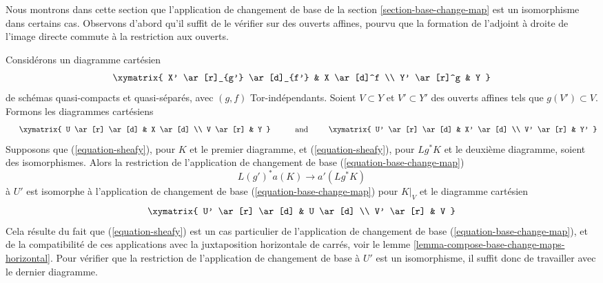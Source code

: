 \noindent
Nous montrons dans cette section que l'application de changement de base de la section \ref{section-base-change-map} est un isomorphisme dans certains cas. Observons d'abord qu'il suffit de le vérifier sur des ouverts affines, pourvu que la formation de l'adjoint à droite de l'image directe commute à la restriction aux ouverts.

\begin{remark}
\label{remark-check-over-affines}
Considérons un diagramme cartésien
$$
\xymatrix{
X' \ar[r]_{g'} \ar[d]_{f'} & X \ar[d]^f \\
Y' \ar[r]^g & Y
}
$$
de schémas quasi-compacts et quasi-séparés, avec $(g, f)$ Tor-indépendants. Soient $V \subset Y$ et $V' \subset Y'$ des ouverts affines tels que $g(V') \subset V$. Formons les diagrammes cartésiens
$$
\vcenter{
\xymatrix{
U \ar[r] \ar[d] & X \ar[d] \\
V \ar[r] & Y
}
}
\quad\text{and}\quad
\vcenter{
\xymatrix{
U' \ar[r] \ar[d] & X' \ar[d] \\
V' \ar[r] & Y'
}
}
$$
Supposons que (\ref{equation-sheafy}), pour $K$ et le premier diagramme, et (\ref{equation-sheafy}), pour $Lg^*K$ et le deuxième diagramme, soient des isomorphismes. Alors la restriction de l'application de changement de base (\ref{equation-base-change-map})
$$
L(g')^*a(K) \longrightarrow a'(Lg^*K)
$$
à $U'$ est isomorphe à l'application de changement de base (\ref{equation-base-change-map}) pour $K|_V$ et le diagramme cartésien
$$
\xymatrix{
U' \ar[r] \ar[d] & U \ar[d] \\
V' \ar[r] & V
}
$$
Cela résulte du fait que (\ref{equation-sheafy}) est un cas particulier de l'application de changement de base (\ref{equation-base-change-map}), et de la compatibilité de ces applications avec la juxtaposition horizontale de carrés, voir le lemme \ref{lemma-compose-base-change-maps-horizontal}. Pour vérifier que la restriction de l'application de changement de base à $U'$ est un isomorphisme, il suffit donc de travailler avec le dernier diagramme.
\end{remark}

